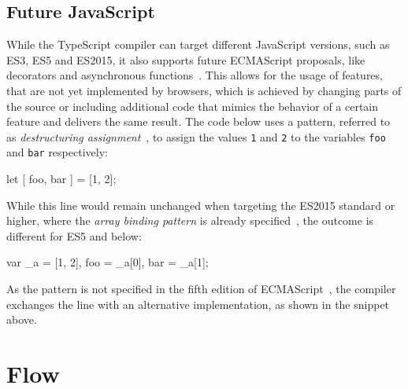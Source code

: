 
\subsection{Future JavaScript}
\label{sec:ts-future-javascript}

While the TypeScript compiler can target different JavaScript versions, such as ES3, ES5 and ES2015, it also supports future ECMAScript proposals, like decorators and asynchronous functions~\cites{TypeScriptHandbook:CompilerOptions, TypeScriptWebsite}. This allows for the usage of features, that are not yet implemented by browsers, which is achieved by changing parts of the source or including additional code that mimics the behavior of a certain feature and delivers the same result. The code below uses a pattern, referred to as \emph{destructuring assignment}~\cite{DestructuringAssignment:Mozilla:2015}, to assign the values \texttt{1} and \texttt{2} to the variables \texttt{foo} and \texttt{bar} respectively:
\begin{JsCode}[numbers=none]
let [ foo, bar ] = [1, 2];  
\end{JsCode}
While this line would remain unchanged when targeting the ES2015 standard or higher, where the \emph{array binding pattern} is already specified~\cite[p.~198]{ES6Spec:Ecma:2015}, the outcome is different for ES5 and below:
\begin{JsCode}[numbers=none]
var _a = [1, 2], foo = _a[0], bar = _a[1];
\end{JsCode}
As the pattern is not specified in the fifth edition of ECMAScript~\cite{ES5Spec:Ecma:2015}, the compiler exchanges the line with an alternative implementation, as shown in the snippet above.
 
\section{Flow}
\label{sec:flow}

